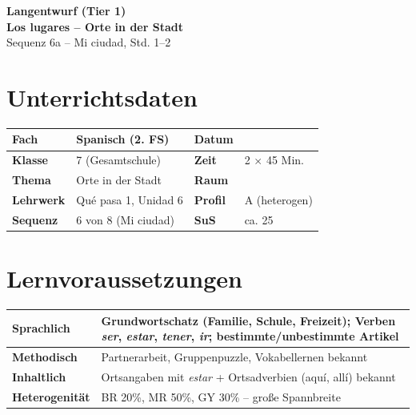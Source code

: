 \documentclass[11pt,a4paper]{article}
\begin{document}
\begin{center}
{\Large\textbf{\textcolor{spanisch}{Langentwurf (Tier 1)}}}\\[0.5em]
{\LARGE\textbf{Los lugares -- Orte in der Stadt}}\\[0.3em]
{\large Sequenz 6a -- Mi ciudad, Std. 1--2}
\end{center}

\vspace{1em}

\section*{Unterrichtsdaten}

\begin{tabularx}{\textwidth}{|l|X|l|X|}
\hline
\textbf{Fach} & Spanisch (2. FS) & \textbf{Datum} & \\
\hline
\textbf{Klasse} & 7 (Gesamtschule) & \textbf{Zeit} & 2 $\times$ 45 Min. \\
\hline
\textbf{Thema} & Orte in der Stadt & \textbf{Raum} & \\
\hline
\textbf{Lehrwerk} & Qué pasa 1, Unidad 6 & \textbf{Profil} & A (heterogen) \\
\hline
\textbf{Sequenz} & 6 von 8 (Mi ciudad) & \textbf{SuS} & ca. 25 \\
\hline
\end{tabularx}

\vspace{1em}

\section*{Lernvoraussetzungen}

\begin{tabularx}{\textwidth}{|l|X|}
\hline
\textbf{Sprachlich} & Grundwortschatz (Familie, Schule, Freizeit); Verben \textit{ser}, \textit{estar}, \textit{tener}, \textit{ir}; bestimmte/unbestimmte Artikel \\
\hline
\textbf{Methodisch} & Partnerarbeit, Gruppenpuzzle, Vokabellernen bekannt \\
\hline
\textbf{Inhaltlich} & Ortsangaben mit \textit{estar} + Ortsadverbien (aquí, allí) bekannt \\
\hline
\textbf{Heterogenität} & BR 20\%, MR 50\%, GY 30\% -- große Spannbreite \\
\hline
\end{tabularx}
\end{document}
